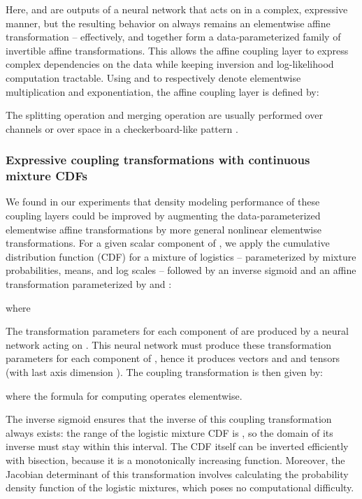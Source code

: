\documentclass{article}
\begin{document}
Here,  and  are outputs of a neural network that acts on  in a complex, expressive manner, but the resulting behavior on  always remains an elementwise affine transformation -- effectively,  and  together form a data-parameterized family of invertible affine transformations. This allows the affine coupling layer to express complex dependencies on the data while keeping inversion and log-likelihood computation tractable. Using  and  to respectively denote elementwise multiplication and exponentiation, the affine coupling layer is defined by:

The splitting operation  and merging operation  are usually performed over channels or over space in a checkerboard-like pattern \citep{dinh2016density}.

\subsubsection{Expressive coupling transformations with continuous mixture CDFs}
\label{sec:mixlogistic}
We found in our experiments that density modeling performance of these coupling layers could be improved by augmenting the data-parameterized elementwise affine transformations by more general nonlinear elementwise transformations. For a given scalar component  of , we apply the cumulative distribution function (CDF) for a mixture of  logistics -- parameterized by mixture probabilities, means, and log scales  -- followed by an inverse sigmoid and an affine transformation parameterized by  and :

where

The transformation parameters  for each component of  are produced by a neural network acting on . This neural network must produce these transformation parameters for each component of , hence it produces vectors  and  and tensors  (with last axis dimension ). The coupling transformation is then given by:

where the formula for computing  operates elementwise.

The inverse sigmoid ensures that the inverse of this coupling transformation always exists: the range of the logistic mixture CDF is , so the domain of its inverse must stay within this interval. The CDF itself can be inverted efficiently with bisection, because it is a monotonically increasing function. Moreover, the Jacobian determinant of this transformation involves calculating the probability density function of the logistic mixtures,
which poses no computational difficulty.
\end{document}
